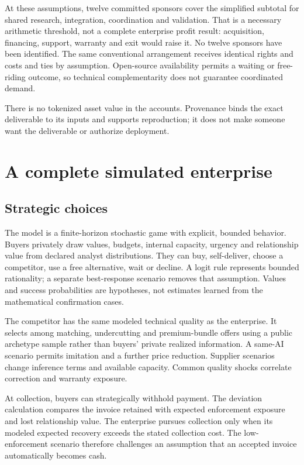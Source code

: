 \documentclass[
  11pt,
]{article}
\begin{document}
At these assumptions, twelve committed sponsors cover the simplified
subtotal for shared research, integration, coordination and validation.
That is a necessary arithmetic threshold, not a complete enterprise
profit result: acquisition, financing, support, warranty and exit would
raise it. No twelve sponsors have been identified. The same conventional
arrangement receives identical rights and costs and ties by assumption.
Open-source availability permits a waiting or free-riding outcome, so
technical complementarity does not guarantee coordinated demand.

There is no tokenized asset value in the accounts. Provenance binds the
exact deliverable to its inputs and supports reproduction; it does not
make someone want the deliverable or authorize deployment.

\hypertarget{a-complete-simulated-enterprise}{%
\section{A complete simulated
enterprise}\label{a-complete-simulated-enterprise}}

\hypertarget{strategic-choices}{%
\subsection{Strategic choices}\label{strategic-choices}}

The model is a finite-horizon stochastic game with explicit, bounded
behavior. Buyers privately draw values, budgets, internal capacity,
urgency and relationship value from declared analyst distributions. They
can buy, self-deliver, choose a competitor, use a free alternative, wait
or decline. A logit rule represents bounded rationality; a separate
best-response scenario removes that assumption. Values and success
probabilities are hypotheses, not estimates learned from the
mathematical confirmation cases.

The competitor has the same modeled technical quality as the enterprise.
It selects among matching, undercutting and premium-bundle offers using
a public archetype sample rather than buyers' private realized
information. A same-AI scenario permits imitation and a further price
reduction. Supplier scenarios change inference terms and available
capacity. Common quality shocks correlate correction and warranty
exposure.

At collection, buyers can strategically withhold payment. The deviation
calculation compares the invoice retained with expected enforcement
exposure and lost relationship value. The enterprise pursues collection
only when its modeled expected recovery exceeds the stated collection
cost. The low-enforcement scenario therefore challenges an assumption
that an accepted invoice automatically becomes cash.
\end{document}
